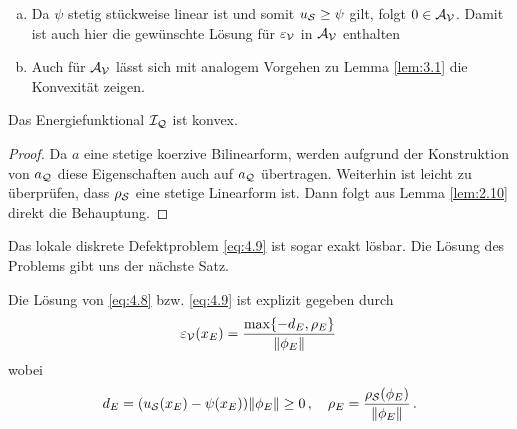 \begin{bem}\label{bem:4.9}
\begin{enumerate}[(a)]
\item Da $\psi$ stetig stückweise linear ist und somit $u_{\mathcal S} \ge \psi$ gilt, folgt $0 \in \mathcal A_{\mathcal V}$. Damit ist auch hier die gewünschte Lösung für $\varepsilon_{\mathcal V}$ in $\mathcal A_{\mathcal V}$ enthalten
\item	Auch für $\mathcal A_{\mathcal V}$ lässt sich mit analogem Vorgehen zu Lemma \ref{lem:3.1} die Konvexität zeigen.
\end{enumerate}
\end{bem}


\begin{lemma}\label{lem:4.10}
Das Energiefunktional $\mathcal I_{\mathcal Q}$ ist konvex.
\end{lemma}

\begin{proof}
Da $a$ eine stetige koerzive Bilinearform, werden aufgrund der Konstruktion von $a_{\mathcal Q}$ diese Eigenschaften auch auf $a_{\mathcal Q}$ übertragen. Weiterhin ist leicht zu überprüfen, dass $\rho_{\mathcal S}$ eine stetige Linearform ist. Dann folgt aus Lemma \ref{lem:2.10} direkt die Behauptung.
\end{proof}


Das lokale diskrete Defektproblem \eqref{eq:4.9} ist sogar exakt lösbar. Die Lösung des Problems gibt uns der nächste Satz.


\begin{satz}\label{satz:4.11}
Die Lösung von \eqref{eq:4.8} bzw. \eqref{eq:4.9} ist explizit gegeben durch
\begin{align}\label{eq:4.10}
	\varepsilon_{\mathcal V} (x_E) = \frac{\max \{-d_E,\rho_E\}}{\lVert \phi_E\rVert} \, 
\end{align}
wobei
\begin{align}\label{eq:4.11}
	d_E = (u_{\mathcal S}(x_E) - \psi (x_E))\lVert \phi_E\rVert \ge 0 \, , \quad \rho_E = \frac{\rho_{\mathcal S}(\phi_E)}{\lVert \phi_E\rVert} \, .
\end{align}
\end{satz}

